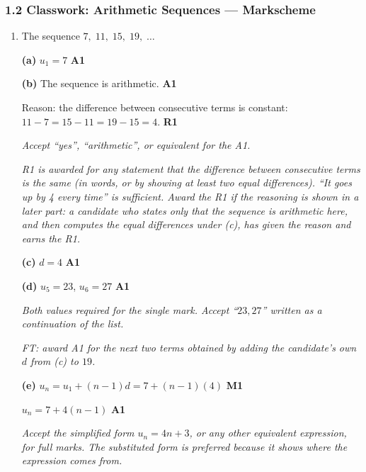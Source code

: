 \documentclass[12pt, twoside]{article}
\begin{document}
\subsubsection*{1.2 Classwork: Arithmetic Sequences --- Markscheme}

\begin{enumerate}[itemsep=0.3cm]

\item[1.] [Maximum mark: 8]

The sequence $7,\; 11,\; 15,\; 19,\; \ldots$

\medskip

\textbf{(a)} $u_{1} = 7$ \hfill \textbf{A1}

\medskip

\textbf{(b)} The sequence is arithmetic. \hfill \textbf{A1}

Reason: the difference between consecutive terms is constant:
$11 - 7 = 15 - 11 = 19 - 15 = 4$. \hfill \textbf{R1}

\emph{Accept ``yes'', ``arithmetic'', or equivalent for the A1.}

\emph{R1 is awarded for any statement that the difference between
consecutive terms is the same (in words, or by showing at least two
equal differences). ``It goes up by 4 every time'' is sufficient.
Award the R1 if the reasoning is shown in a later part: a candidate who
states only that the sequence is arithmetic here, and then computes the
equal differences under (c), has given the reason and earns the R1.}

\medskip

\textbf{(c)} $d = 4$ \hfill \textbf{A1}

\medskip

\textbf{(d)} $u_{5} = 23$, $u_{6} = 27$ \hfill \textbf{A1}

\emph{Both values required for the single mark. Accept
``$23, 27$'' written as a continuation of the list.}

\emph{FT: award A1 for the next two terms obtained by adding the
candidate's own $d$ from (c) to $19$.}

\medskip

\textbf{(e)} $u_{n} = u_{1} + (n-1)d = 7 + (n-1)(4)$ \hfill \textbf{M1}

$u_{n} = 7 + 4(n-1)$ \hfill \textbf{A1}

\emph{Accept the simplified form $u_{n} = 4n + 3$, or any other equivalent
expression, for full marks. The substituted form is preferred because it shows
where the expression comes from.}


\end{enumerate}
\end{document}
